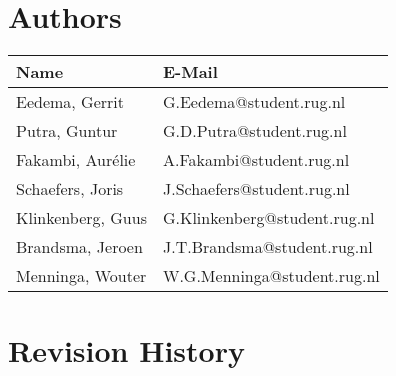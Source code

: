 \section*{Authors}

\begin{tabular}{L{} L{}}
    \textbf{Name} & \textbf{E-Mail} \\ \toprule
	Eedema, Gerrit & G.Eedema@student.rug.nl\\
	Putra, Guntur & G.D.Putra@student.rug.nl\\
	Fakambi, Aur\'{e}lie & A.Fakambi@student.rug.nl\\
	Schaefers, Joris & J.Schaefers@student.rug.nl\\
	Klinkenberg, Guus & G.Klinkenberg@student.rug.nl\\
	Brandsma, Jeroen & J.T.Brandsma@student.rug.nl\\
	Menninga, Wouter & W.G.Menninga@student.rug.nl\\ \bottomrule
\end{tabular}

\section*{Revision History}

